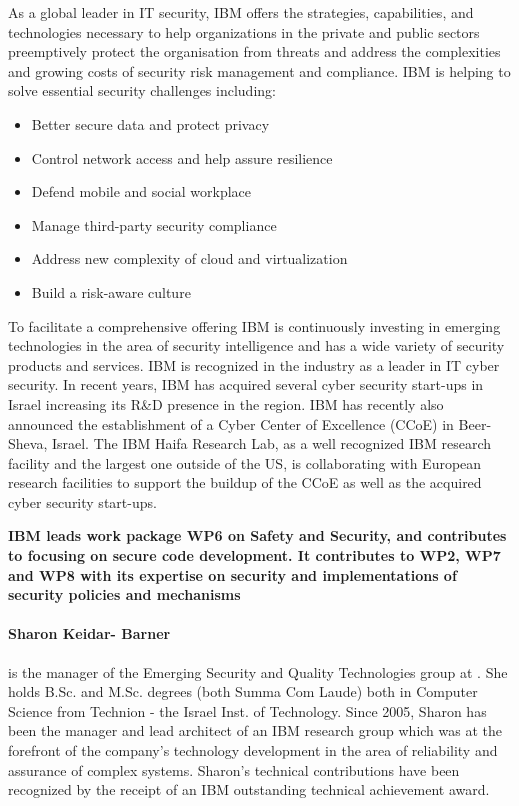 \documentclass[a4paper,11pt]{article}
\begin{document}
As a global leader in IT security, IBM offers the strategies, capabilities, and technologies necessary to help organizations in the private and public sectors preemptively protect the organisation from threats and address the complexities and growing costs of security risk management and compliance. IBM is helping to solve essential security challenges including:
\begin{itemize}
\item
  Better secure data and protect privacy
\item
	Control network access and help assure resilience
\item
	Defend mobile and social workplace
\item
	Manage third-party security compliance
\item
	Address new complexity of cloud and virtualization
\item
	Build a risk-aware culture
\end{itemize} 	
To facilitate a comprehensive offering IBM is continuously investing in emerging technologies in the area of security intelligence and has a wide variety of security products and services. IBM is recognized in the industry as a leader in IT cyber security.
In recent years, IBM has acquired several cyber security start-ups in Israel increasing its R\&D presence in the region. IBM has recently also announced the establishment of a Cyber Center of Excellence (CCoE) in Beer-Sheva, Israel. The IBM Haifa Research Lab, as a well recognized IBM research facility and the largest one outside of the US, is collaborating with European research facilities to support the buildup of the CCoE as well as the acquired cyber security start-ups.

\vspace{10pt}
\textbf{IBM leads work package WP6 on Safety and Security, and contributes to focusing on secure code development. It contributes to WP2,  WP7 and WP8 with its expertise on security and implementations of security policies and mechanisms}
\vspace{10pt}

\paragraph{Sharon Keidar- Barner}  is the manager of the Emerging Security and Quality Technologies group at \IBM. She holds B.Sc. and M.Sc. degrees (both Summa Com Laude) both in 
Computer Science from Technion - the Israel Inst. of Technology. Since 2005, Sharon has been the manager and lead architect of an IBM research group which was at the forefront of the company's technology development in the area of reliability and assurance of complex systems. Sharon's technical contributions have been recognized by the receipt of an IBM outstanding technical achievement award.
\end{document}
